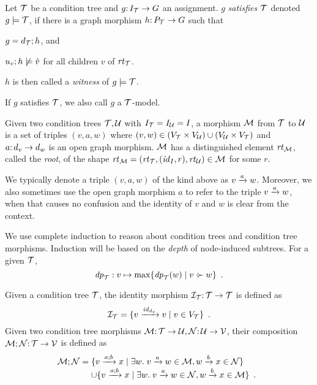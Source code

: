 \begin{definition}[satisfaction]\label{def:satisfaction}
Let ${\mathcal{T}}$ be a condition tree and $g{:}\, I_{\mathcal{T}}\rightarrow G$ an assignment. $g$ \emph{satisfies ${\mathcal{T}}$} denoted $g\models {\mathcal{T}}$, if there is a graph morphism $h{:}\, P_{\mathcal{T}}\rightarrow G$ such that
\begin{inumerate}
\item $g=d_{\mathcal{T}};h$, and 
\item $u_v;h\not\models \hat v$ for all children $v$ of $\mathit{rt}_{{\mathcal{T}}}$.
\end{inumerate}
$h$ is then called a \emph{witness} of $g\models {\mathcal{T}}$.
\end{definition}
%
If $g$ satisfies ${\mathcal{T}}$, we also call $g$ a ${\mathcal{T}}$-model.


\begin{definition}[morphism]
Given two condition trees ${\mathcal{T}},{\mathcal{U}}$ with $I_{\mathcal{T}}=I_{\mathcal{U}}=I$, a morphism ${\mathcal{M}}$ from ${\mathcal{T}}$ to ${\mathcal{U}}$ is a set of triples $(v,a,w)$ where $(v,w)\in (V_{\mathcal{T}}\times V_{\mathcal{U}})\cup (V_{\mathcal{U}}\times V_{\mathcal{T}})$ and $a{:}\, d_v\rightarrow d_w$ is an open graph morphism. ${\mathcal{M}}$ has a distinguished element $\mathit{rt}_{{\mathcal{M}}}$, called the \emph{root}, of the shape $\mathit{rt}_{{\mathcal{M}}}=(\mathit{rt}_{{\mathcal{T}}},({\mathit{id}}_I,r),\mathit{rt}_{{\mathcal{U}}})\in {\mathcal{M}}$ for some $r$.
\end{definition}
%
We typically denote a triple $(v,a,w)$ of the kind above as ${v}\xrightarrow{a}{w}$. Moreover, we also sometimes use the open graph morphism $a$ to refer to the triple ${v}\xrightarrow{a}{w}$, when that causes no confusion and the identity of $v$ and $w$ is clear from the context.

We use complete induction to reason about condition trees and condition tree morphisms. Induction will be based on the \emph{depth} of node-induced subtrees. For a given ${\mathcal{T}}$,
%
\[ {\mathit{dp}}_{\mathcal{T}}: v\mapsto \max \{{{{\mathit{dp}}_{\mathcal{T}}(w)}\mid{v\mathrel{\cdot\mskip-8mu\succ}w}}\} \enspace. \]


\medskip\noindent
Given a condition tree ${\mathcal{T}}$, the identity morphism ${\mathcal{I}}_{\mathcal{T}}{:}\, {\mathcal{T}}\rightarrow{\mathcal{T}}$ is defined as
\[ {\mathcal{I}}_{\mathcal{T}} = \{{{v}\xrightarrow{{\mathit{id}}_{d_v}}{v} \mid v\in V_{\mathcal{T}}}\} \enspace. \]
Given two condition tree morphisms ${\mathcal{M}}{:}\, {\mathcal{T}}\rightarrow {\mathcal{U}},{\mathcal{N}}{:}\, {\mathcal{U}}\rightarrow {\mathcal{V}}$, their composition ${\mathcal{M}};{\mathcal{N}}{:}\, {\mathcal{T}}\rightarrow {\mathcal{V}}$ is defined as
\[ \cM;\cN =
\begin{array}[t]{@{}l}
	\setof{\trip v{a;b}x \mid \exists w\st \trip v a w\in\cM, \trip wbx\in \cN} \\
	\cup \setof{\trip v{a;b}x \mid \exists w\st \trip vaw\in\cN, \trip wbx\in\cM} \enspace.
\end{array}
\]

